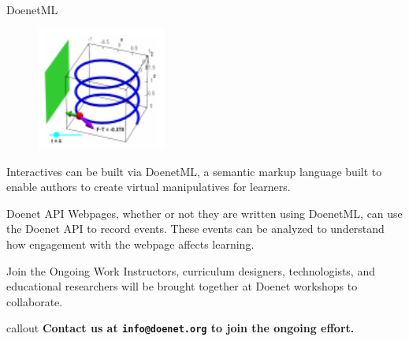 \vspace{-2ex}
\vspace{1ex}

\begin{sectionblock}{DoenetML}

  \begin{figure}
    \includegraphics[width=0.38\textwidth]{vector-field.pdf}
  \end{figure}
  Interactives can be built via DoenetML, a semantic markup
  language built to enable authors to create virtual manipulatives for
  learners.
\end{sectionblock}

\vspace{1ex}

\begin{sectionblock}{Doenet API}
  Webpages, whether or not they are written using DoenetML, can use
  the Doenet API to record events.  These events can be analyzed to
  understand how engagement with the webpage affects learning.
  
\end{sectionblock}

\vspace{1ex}

\begin{sectionblock}{Join the Ongoing Work}
  Instructors, curriculum designers, technologists, and educational
  researchers will be brought together at Doenet workshops to
  collaborate.

  \vspace{1ex}
  \begin{beamercolorbox}[sep=0.5em]{callout}
    \vspace{1ex}\textbf{Contact us at \texttt{info@doenet.org} to join the
      ongoing effort.}
  \end{beamercolorbox}
\end{sectionblock}


